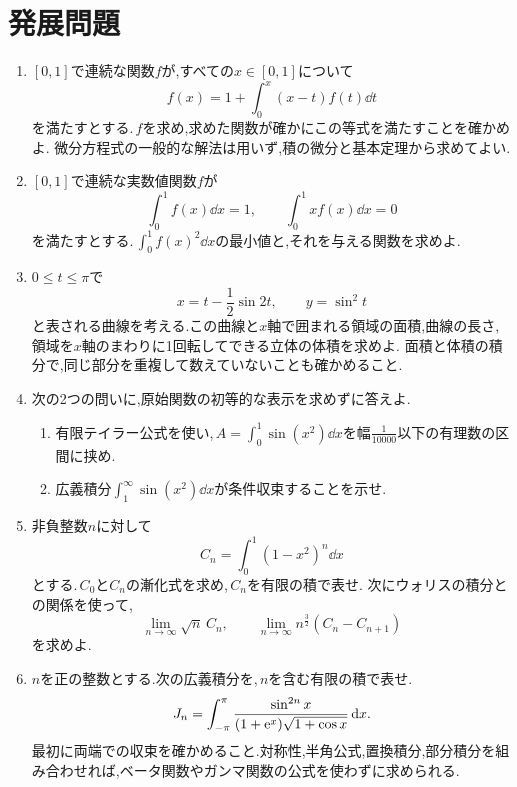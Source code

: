 \section{発展問題}\label{節:総合発展}

\begin{enumerate}[label=\textbf{\thechapter.\arabic*},leftmargin=*,start=13]
 \item\label{問:総合十三積分方程式}
 $[0,1]$で連続な関数$f$が,すべての$x\in[0,1]$について
 \[
  f(x)=1+\int_0^x(x-t)f(t)\dd t
 \]
 を満たすとする.\,$f$を求め,求めた関数が確かにこの等式を満たすことを確かめよ.
 微分方程式の一般的な解法は用いず,積の微分と基本定理から求めてよい.
 \item\label{問:総合十四二つの制約}
 $[0,1]$で連続な実数値関数$f$が
 \[
  \int_0^1f(x)\dd x=1,\qquad
  \int_0^1xf(x)\dd x=0
 \]
 を満たすとする.\,$\int_0^1f(x)^2\dd x$の最小値と,それを与える関数を求めよ.
 \item\label{問:総合十五媒介曲線}
 $0\le t\le\pi$で
 \[
  x=t-\frac12\sin2t,\qquad y=\sin^2t
 \]
 と表される曲線を考える.この曲線と$x$軸で囲まれる領域の面積,曲線の長さ,領域を$x$軸のまわりに1回転してできる立体の体積を求めよ.
 面積と体積の積分で,同じ部分を重複して数えていないことも確かめること.
 \item\label{問:総合十六近似と条件収束}
 次の2つの問いに,原始関数の初等的な表示を求めずに答えよ.
 \begin{enumerate}[label=(\arabic*),leftmargin=*]
  \item 有限テイラー公式を使い,\,$A=\int_0^1\sin(x^2)\dd x$を幅$\frac1{10000}$以下の有理数の区間に挟め.
  \item 広義積分$\int_1^{\infty}\sin(x^2)\dd x$が条件収束することを示せ.
 \end{enumerate}
 \item\label{問:総合十七ウォリス}
 非負整数$n$に対して
 \[
  C_n=\int_0^1(1-x^2)^n\dd x
 \]
 とする.\,$C_0$と$C_n$の漸化式を求め,\,$C_n$を有限の積で表せ.
 次にウォリスの積分との関係を使って,
 \[
  \lim_{n\to\infty}\sqrt n\,C_n,
  \qquad
  \lim_{n\to\infty}n^{\frac32}(C_n-C_{n+1})
 \]
 を求めよ.
 \item\label{問:総合十八相補と半角}
 $n$を正の整数とする.次の広義積分を,\,$n$を含む有限の積で表せ.
 \[
  J_n=\int_{-\pi}^{\pi}
  \frac{\sin^{2n}x}{(1+\mathrm{e}^x)\sqrt{1+\cos x}}\,\mathrm{d} x.
 \]
 最初に両端での収束を確かめること.対称性,半角公式,置換積分,部分積分を組み合わせれば,ベータ関数やガンマ関数の公式を使わずに求められる.
\end{enumerate}

\clearpage

